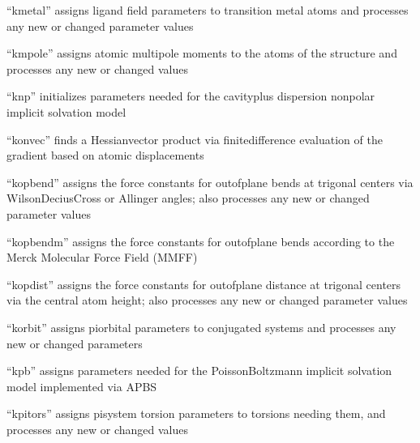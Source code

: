 \documentclass[letterpaper,11pt,english]{sphinxmanual}
\begin{document}

“kmetal” assigns ligand field parameters to transition metal
atoms and processes any new or changed parameter values


“kmpole” assigns atomic multipole moments to the atoms of
the structure and processes any new or changed values


“knp” initializes parameters needed for the cavity\sphinxhyphen{}plus\sphinxhyphen{}
dispersion nonpolar implicit solvation model


“konvec” finds a Hessian\sphinxhyphen{}vector product via finite\sphinxhyphen{}difference
evaluation of the gradient based on atomic displacements


“kopbend” assigns the force constants for out\sphinxhyphen{}of\sphinxhyphen{}plane bends
at trigonal centers via Wilson\sphinxhyphen{}Decius\sphinxhyphen{}Cross or Allinger angles;
also processes any new or changed parameter values


“kopbendm” assigns the force constants for out\sphinxhyphen{}of\sphinxhyphen{}plane bends
according to the Merck Molecular Force Field (MMFF)


“kopdist” assigns the force constants for out\sphinxhyphen{}of\sphinxhyphen{}plane
distance at trigonal centers via the central atom height;
also processes any new or changed parameter values


“korbit” assigns pi\sphinxhyphen{}orbital parameters to conjugated systems
and processes any new or changed parameters


“kpb” assigns parameters needed for the Poisson\sphinxhyphen{}Boltzmann
implicit solvation model implemented via APBS


“kpitors” assigns pi\sphinxhyphen{}system torsion parameters to torsions
needing them, and processes any new or changed values
\end{document}
